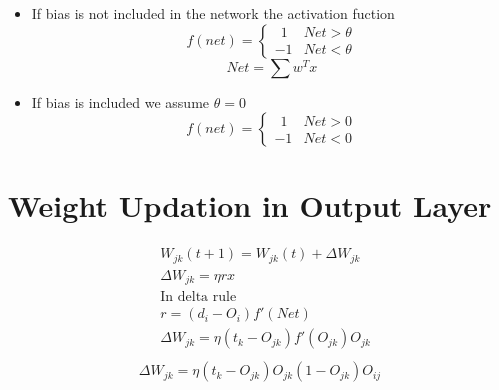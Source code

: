 \documentclass[12pt, right open]{memoir}
\newcommand{\matplus}
{
~~
}
\begin{document}
\begin{itemize}
\begin{figure}[ht!]
\end{figure}

\item If bias is not included in the network the activation fuction 
\[
f(net) = \begin{cases}
          \matplus1 & Net > \theta \\
          -1        & Net < \theta
          \end{cases}
\]
\[
Net = \sum w^Tx
\]
\item If bias is included we assume $\theta = 0$
\[
f(net) = \begin{cases}
          	\matplus1 & Net > 0 \\
          	-1 		  & Net < 0
          \end{cases}
\]
\end{itemize}

\section{Weight Updation in Output Layer}
\begin{align*}
& W_{jk}(t+1) = W_{jk}(t) + \Delta W_{jk}  \\ 
& \Delta W_{jk} = \eta r x  \\
& \text{In delta rule}  \\
& r = (d_i - O_i) f'(Net)  \\
& \Delta W_{jk}= \eta (t_k - O_{jk}) f' (O_{jk})O_{jk}  \\
\end{align*}
\begin{align}
\Delta W_{jk} = \eta (t_k - O_{jk}) O_{jk}(1-O_{jk})O_{ij}
\end{align}
\end{document}
